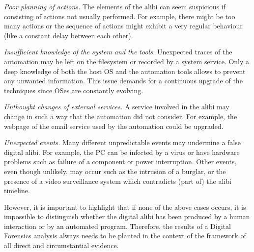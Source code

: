 \documentclass[10pt, conference]{IEEEtran}
\begin{document}
\noindent \textit{Poor planning of actions.} 
The elements of the alibi can seem suspicious if consisting of actions not usually performed. For example, there might be too many actions or the sequence of actions might exhibit a very regular behaviour (like a constant delay between each other).

\noindent \textit{Insufficient knowledge of the system and the tools.}
Unexpected traces of the automation may be left on the filesystem or recorded by a system service. Only a deep knowledge of both the host OS and the automation tools allows to prevent any unwanted information. This issue demands for a continuous upgrade of the techniques since OSes are constantly evolving.

\noindent \textit{Unthought changes of external services.}
A service involved in the alibi may change in such a way that the automation did not consider. For example, the webpage of the email service used by the automation could be upgraded.

\noindent \textit{Unexpected events.}
Many different unpredictable events may undermine a false digital alibi.
For example, the PC can be infected by a virus or have hardware problems such as failure of a component or power interruption. Other events, even though unlikely, may occur such as the intrusion of a burglar, or the presence of a video surveillance system which contradicts (part of) the alibi timeline. 

However, it is important to highlight that if none of the above cases occurs, it is impossible to distinguish whether the digital alibi has been produced by a human interaction or by an automated program.  
Therefore, the results of a Digital Forensics analysis always needs to be planted in the context of the framework of all direct and circumstantial evidence.

\end{document}
